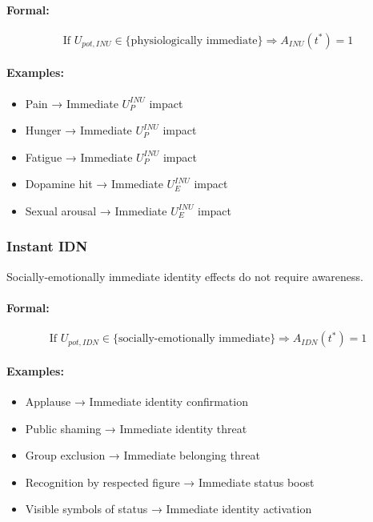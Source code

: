 \paragraph{Formal:}
\begin{equation}
\text{If } U_{pot,INU} \in \{\text{physiologically immediate}\} \Rightarrow A_{INU}(t^*) = 1
\end{equation}

\paragraph{Examples:}
\begin{itemize}
\item Pain → Immediate $U^{INU}_P$ impact
\item Hunger → Immediate $U^{INU}_P$ impact
\item Fatigue → Immediate $U^{INU}_P$ impact
\item Dopamine hit → Immediate $U^{INU}_E$ impact
\item Sexual arousal → Immediate $U^{INU}_E$ impact
\end{itemize}

\subsubsection{Instant IDN}

\begin{axiom}
\label{ax:instant-idn}
Socially-emotionally immediate identity effects do not require awareness.
\end{axiom}

\paragraph{Formal:}
\begin{equation}
\text{If } U_{pot,IDN} \in \{\text{socially-emotionally immediate}\} \Rightarrow A_{IDN}(t^*) = 1
\end{equation}

\paragraph{Examples:}
\begin{itemize}
\item Applause → Immediate identity confirmation
\item Public shaming → Immediate identity threat
\item Group exclusion → Immediate belonging threat
\item Recognition by respected figure → Immediate status boost
\item Visible symbols of status → Immediate identity activation
\end{itemize}

